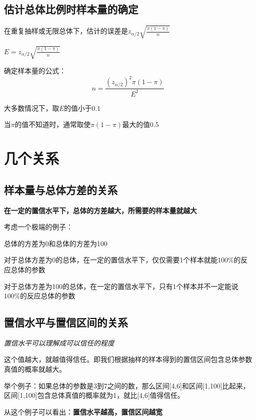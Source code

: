 \documentclass[UTF8,10pt]{book}
\begin{document}
            \subsection{估计总体比例时样本量的确定}
                    
            {\kaishu 在重复抽样或无限总体下，估计的误差是$z_{\alpha/2}  \sqrt{\frac{\pi(1-\pi)}{n}}$

            $E = z_{\alpha/2}  \sqrt{\frac{\pi(1-\pi)}{n}}$}

            确定样本量的公式：
                $$ n =  \frac{(z_{\alpha/2})^2 \pi (1-\pi)}{E^2}$$

            {\kaishu 大多数情况下，取$E$的值小于$0.1$
            
            当$\pi$的值不知道时，通常取使$\pi(1-\pi)$最大的值$0.5$}
        
        \section{几个关系}
        	\subsection{样本量与总体方差的关系}
        		\textbf{在一定的置信水平下，总体的方差越大，所需要的样本量就越大}
        		
        		{\kaishu
        		考虑一个极端的例子：
        		
        		总体的方差为0和总体的方差为100
        		
        		对于总体方差为0的总体，在一定的置信水平下，仅仅需要1个样本就能100\%的反应总体的参数
        		
        		对于总体方差为100的总体，在一定的置信水平下，只有1个样本并不一定能说100\%的反应总体的参数}
        	
        	\subsection{置信水平与置信区间的关系}
        		\textit{置信水平可以理解成可以信任的程度}
        		
        		{\kaishu
        		这个值越大，就越值得信任。即我们根据抽样的样本得到的置信区间包含总体参数真值的概率就越大。
        		
        		举个例子：如果总体的参数是3到7之间的数，那么区间[4,6]和区间[1,100]比起来，区间[1,100]包含总体真值的概率就为1，就比[4,6]值得信任。}
        		
        		从这个例子可以看出：\textbf{置信水平越高，置信区间越宽}
        		
\end{document}
